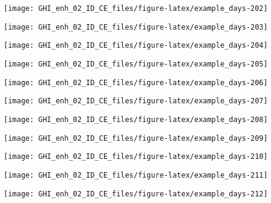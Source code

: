 \documentclass[
  10pt,
  a4paper,oneside]{article}
\begin{document}
\begin{center}\texttt{[image: GHI\_enh\_02\_ID\_CE\_files/figure-latex/example\_days-202]} \end{center}

\begin{center}\texttt{[image: GHI\_enh\_02\_ID\_CE\_files/figure-latex/example\_days-203]} \end{center}

\begin{center}\texttt{[image: GHI\_enh\_02\_ID\_CE\_files/figure-latex/example\_days-204]} \end{center}

\begin{center}\texttt{[image: GHI\_enh\_02\_ID\_CE\_files/figure-latex/example\_days-205]} \end{center}

\begin{center}\texttt{[image: GHI\_enh\_02\_ID\_CE\_files/figure-latex/example\_days-206]} \end{center}

\begin{center}\texttt{[image: GHI\_enh\_02\_ID\_CE\_files/figure-latex/example\_days-207]} \end{center}

\begin{center}\texttt{[image: GHI\_enh\_02\_ID\_CE\_files/figure-latex/example\_days-208]} \end{center}

\begin{center}\texttt{[image: GHI\_enh\_02\_ID\_CE\_files/figure-latex/example\_days-209]} \end{center}

\begin{center}\texttt{[image: GHI\_enh\_02\_ID\_CE\_files/figure-latex/example\_days-210]} \end{center}

\begin{center}\texttt{[image: GHI\_enh\_02\_ID\_CE\_files/figure-latex/example\_days-211]} \end{center}

\begin{center}\texttt{[image: GHI\_enh\_02\_ID\_CE\_files/figure-latex/example\_days-212]} \end{center}
\end{document}
